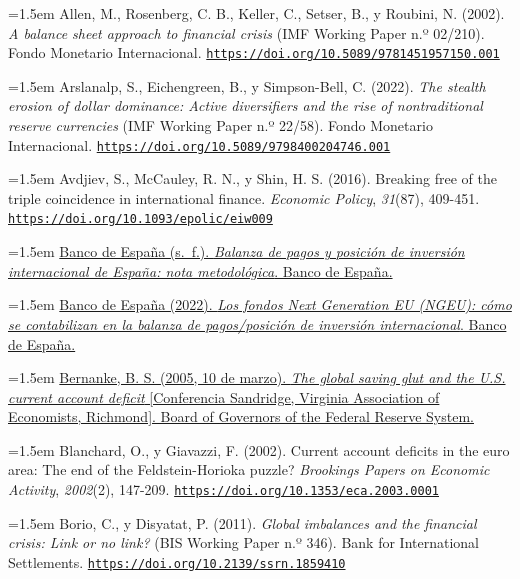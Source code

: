 \documentclass[10pt,a4paper]{article}
\begin{document}
\noindent\hangindent=1.5em Allen, M., Rosenberg, C. B., Keller, C., Setser, B., y Roubini, N. (2002). \textit{A balance sheet approach to financial crisis} (IMF Working Paper n.º 02/210). Fondo Monetario Internacional. \href{https://doi.org/10.5089/9781451957150.001}{\nolinkurl{https://doi.org/10.5089/9781451957150.001}}

\noindent\hangindent=1.5em Arslanalp, S., Eichengreen, B., y Simpson-Bell, C. (2022). \textit{The stealth erosion of dollar dominance: Active diversifiers and the rise of nontraditional reserve currencies} (IMF Working Paper n.º 22/58). Fondo Monetario Internacional. \href{https://doi.org/10.5089/9798400204746.001}{\nolinkurl{https://doi.org/10.5089/9798400204746.001}}

\noindent\hangindent=1.5em Avdjiev, S., McCauley, R. N., y Shin, H. S. (2016). Breaking free of the triple coincidence in international finance. \textit{Economic Policy}, \textit{31}(87), 409-451. \href{https://doi.org/10.1093/epolic/eiw009}{\nolinkurl{https://doi.org/10.1093/epolic/eiw009}}

\noindent\hangindent=1.5em \href{https://www.bde.es/webbe/es/estadisticas/compartido/docs/notametBpPii.pdf}{Banco de España (s.~f.). \textit{Balanza de pagos y posición de inversión internacional de España: nota metodológica}. Banco de España.}

\noindent\hangindent=1.5em \href{https://www.bde.es/webbe/es/estadisticas/compartido/docs/notaNGEU.pdf}{Banco de España (2022). \textit{Los fondos Next Generation EU (NGEU): cómo se contabilizan en la balanza de pagos/posición de inversión internacional}. Banco de España.}

\noindent\hangindent=1.5em \href{https://www.federalreserve.gov/boarddocs/speeches/2005/200503102/default.htm}{Bernanke, B. S. (2005, 10 de marzo). \textit{The global saving glut and the U.S. current account deficit} [Conferencia Sandridge, Virginia Association of Economists, Richmond]. Board of Governors of the Federal Reserve System.}

\noindent\hangindent=1.5em Blanchard, O., y Giavazzi, F. (2002). Current account deficits in the euro area: The end of the Feldstein-Horioka puzzle? \textit{Brookings Papers on Economic Activity}, \textit{2002}(2), 147-209. \href{https://doi.org/10.1353/eca.2003.0001}{\nolinkurl{https://doi.org/10.1353/eca.2003.0001}}

\noindent\hangindent=1.5em Borio, C., y Disyatat, P. (2011). \textit{Global imbalances and the financial crisis: Link or no link?} (BIS Working Paper n.º 346). Bank for International Settlements. \href{https://doi.org/10.2139/ssrn.1859410}{\nolinkurl{https://doi.org/10.2139/ssrn.1859410}}
\end{document}
